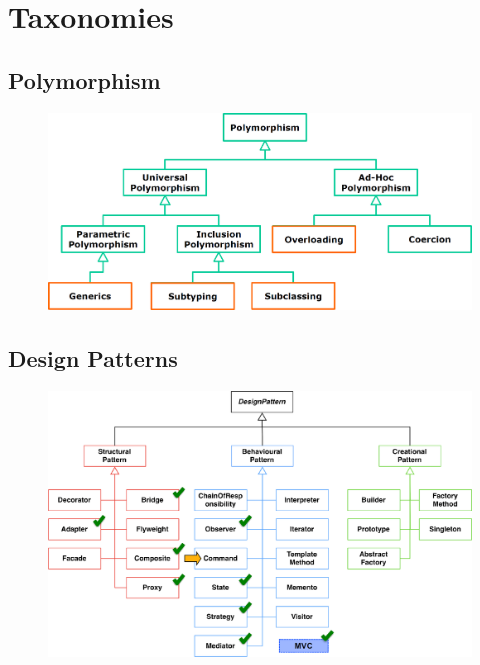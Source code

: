 
\section{Taxonomies}
\subsection{Polymorphism}

\begin{figure}[H]
  \centering
  \includegraphics[width=.85\linewidth]{images/taxonomies_polymorphism.png}
\end{figure}

\subsection{Design Patterns}
\begin{figure}[H]
  \centering
  \includegraphics[width=.85\linewidth]{images/taxonomies_design_patterns.png}
\end{figure}

